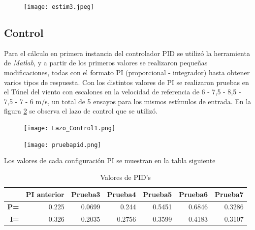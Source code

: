 \begin{figure}[H]
	\centering
	\texttt{[image: estim3.jpeg]}
	\label{fig:estim3}
\end{figure}
       
    \subsection{Control}
    Para el cálculo en primera instancia del controlador PID se utilizó la herramienta de \textit{Matlab}, y a partir de los primeros valores se realizaron pequeñas modificaciones, todas con el formato PI (proporcional - integrador) hasta obtener varios tipos de respuesta.
    Con los distintos valores de PI se realizaron pruebas en el Túnel del viento con escalones en la velocidad de referencia de 6 - 7,5 - 8,5 - 7,5 - 7 - 6 m/s,  un total de 5 ensayos para los mismos estímulos de entrada. En la figura \ref{fig:Lazo_Control} se observa el lazo de control que se utilizó. 
   
    \begin{figure}[H]
   	\centering
   	\texttt{[image: Lazo\_Control1.png]}
   	\label{fig:Lazo_Control}
   \end{figure}
    \begin{figure}[H]
    	\centering
    	\texttt{[image: pruebapid.png]}
    	\label{fig:PI3}
    \end{figure}
    
    Los valores de cada configuración PI se muestran en la tabla siguiente
    \begin{table}[H]
    	\centering
    	\begin{tabular}{r|r|r|r|r|r|r|}
    		\cline{2-7}
    		\multicolumn{1}{l|}{} & \multicolumn{1}{c|}{\textbf{PI anterior}} & \multicolumn{1}{c|}{\textbf{Prueba3}} & \multicolumn{1}{c|}{\textbf{Prueba4}} & \multicolumn{1}{c|}{\textbf{Prueba5}} & \multicolumn{1}{c|}{\textbf{Prueba6}} & \multicolumn{1}{c|}{\textbf{Prueba7}} \\ \hline
    		\multicolumn{1}{|r|}{\textbf{P=}} & 0.225 & 0.0699 & 0.244 & 0.5451 & 0.6846 & 0.3286 \\ \hline
    		\multicolumn{1}{|r|}{\textbf{I=}} & 0.326 & 0.2035 & 0.2756 & 0.3599 & 0.4183 & 0.3107 \\ \hline
    	\end{tabular}
    \caption{Valores de PID's}
    \end{table}
    
